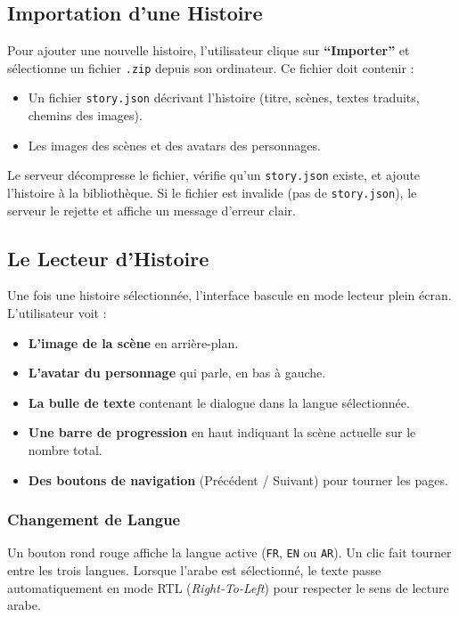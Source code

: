 \documentclass[12pt,twoside,letterpaper]{article}
\begin{document}
\subsection{Importation d'une Histoire}
Pour ajouter une nouvelle histoire, l'utilisateur clique sur \textbf{``Importer''} et sélectionne un fichier \texttt{.zip} depuis son ordinateur. Ce fichier doit contenir :
\begin{itemize}
    \item Un fichier \texttt{story.json} décrivant l'histoire (titre, scènes, textes traduits, chemins des images).
    \item Les images des scènes et des avatars des personnages.
\end{itemize}
Le serveur décompresse le fichier, vérifie qu'un \texttt{story.json} existe, et ajoute l'histoire à la bibliothèque. Si le fichier est invalide (pas de \texttt{story.json}), le serveur le rejette et affiche un message d'erreur clair.

\subsection{Le Lecteur d'Histoire}
Une fois une histoire sélectionnée, l'interface bascule en mode lecteur plein écran. L'utilisateur voit :
\begin{itemize}
    \item \textbf{L'image de la scène} en arrière-plan.
    \item \textbf{L'avatar du personnage} qui parle, en bas à gauche.
    \item \textbf{La bulle de texte} contenant le dialogue dans la langue sélectionnée.
    \item \textbf{Une barre de progression} en haut indiquant la scène actuelle sur le nombre total.
    \item \textbf{Des boutons de navigation} (Précédent / Suivant) pour tourner les pages.
\end{itemize}

\subsubsection{Changement de Langue}
Un bouton rond rouge affiche la langue active (\texttt{FR}, \texttt{EN} ou \texttt{AR}). Un clic fait tourner entre les trois langues. Lorsque l'arabe est sélectionné, le texte passe automatiquement en mode RTL (\textit{Right-To-Left}) pour respecter le sens de lecture arabe.
\end{document}
